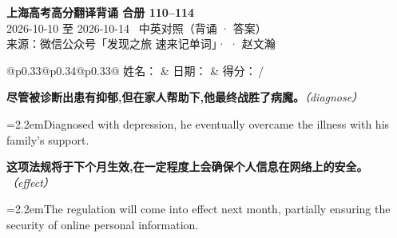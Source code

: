 \documentclass[11pt,a4paper]{article}
\newcommand{\num}[1]{\makebox[1.9em][r]{#1.}\hspace{0.3em}}
\newcommand{\prompt}[1]{\emph{\textcolor{tipblue}{\small（#1）}}}
\begin{document}
\pagestyle{plain}
\begin{center}
{\LARGE\bfseries 上海高考高分翻译背诵 \quad 合册 110–114}\\[0.25em]
{\large 2026-10-10 至 2026-10-14 \quad\ 中英对照（背诵 · 答案）}\\[0.35em]
{\footnotesize 来源：微信公众号「发现之旅 速来记单词」·  · 赵文瀚}
\end{center}

\vspace{0.4em}
\noindent\begin{tabular}{@{}p{0.33\textwidth}@{}p{0.34\textwidth}@{}p{0.33\textwidth}@{}}
姓名：\underline{\hspace{2.0cm}} & 日期：\underline{\hspace{2.0cm}} & 得分：\underline{\hspace{1.4cm}}\,/ \\
\end{tabular}

\vspace{0.5em}

\vspace{0.8em}
\vspace{0.35em}\vspace{0.15em}

\begin{minipage}{\linewidth}

\num{1}\textbf{尽管被诊断出患有抑郁,但在家人帮助下,他最终战胜了病魔。}\prompt{diagnose}

\vspace{0.15em}

\noindent\hangindent=2.2em\hspace{2.2em}Diagnosed with depression, he eventually overcame the illness with his family’s support.

\end{minipage}

\begin{minipage}{\linewidth}

\num{2}\textbf{这项法规将于下个月生效,在一定程度上会确保个人信息在网络上的安全。}\prompt{effect}

\vspace{0.15em}

\noindent\hangindent=2.2em\hspace{2.2em}The regulation will come into effect next month, partially ensuring the security of online personal information.

\end{minipage}
\end{document}

